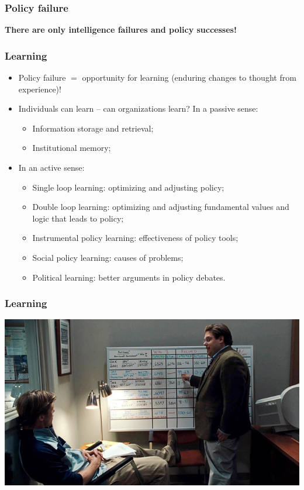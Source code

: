\documentclass[aspectratio=169]{beamer}
\theoremstyle{principle}
\begin{document}
\begin{frame}
\frametitle{Policy failure}

\begin{center}
\Huge \textbf{There are only intelligence failures and policy successes!}
\end{center}

\end{frame}

\begin{frame}
\frametitle{Learning}

\begin{itemize}
\item Policy failure $=$ opportunity for learning (enduring changes to thought from experience)!
\bigskip
\item Individuals can learn -- can organizations learn?  In a passive sense:
\begin{itemize}
\item Information storage and retrieval;
\item Institutional memory;
\end{itemize}
\bigskip
\item In an active sense:
\begin{itemize}
\item Single loop learning: optimizing and adjusting policy;
\item Double loop learning: optimizing and adjusting fundamental values and logic that leads to policy;
\item Instrumental policy learning: effectiveness of policy tools;
\item Social policy learning: causes of problems;
\item Political learning: better arguments in policy debates.
\end{itemize}
\end{itemize}

\end{frame}

\begin{frame}
\frametitle{Learning}

    \begin{center}
     \includegraphics[scale=0.5]{moneyball.jpg}
     \end{center}

\end{frame}
\end{document}
